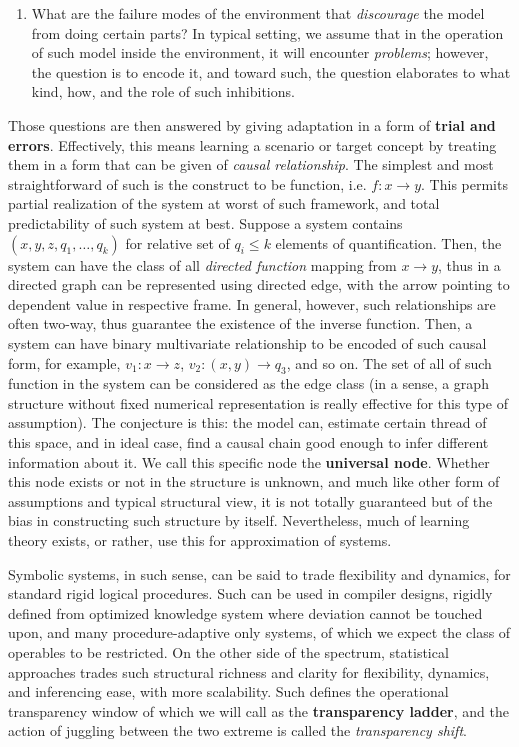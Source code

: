 \begin{enumerate}[itemsep=1pt,topsep=1pt]
    \item What are the failure modes of the environment that \textit{discourage} the model from doing certain parts? In typical setting, we assume that in the operation of such model inside the environment, it will encounter \textit{problems}; however, the question is to encode it, and toward such, the question elaborates to what kind, how, and the role of such inhibitions. 
\end{enumerate}

Those questions are then answered by giving adaptation in a form of \textbf{trial and errors}. Effectively, this means learning a scenario or target concept by treating them in a form that can be given of \textit{causal relationship}. The simplest and most straightforward of such is the construct to be function, i.e. $f:x\to y$. This permits partial realization of the system at worst of such framework, and total predictability of such system at best. Suppose a system contains $(x,y,z,q_{1},\dots,q_{k})$ for relative set of $q_{i}\leq k$ elements of quantification. Then, the system can have the class of all \textit{directed function} mapping from $x\to y$, thus in a directed graph can be represented using directed edge, with the arrow pointing to dependent value in respective frame. In general, however, such relationships are often two-way, thus guarantee the existence of the inverse function. Then, a system can have binary multivariate relationship to be encoded of such causal form, for example, $v_{1}: x\to z$, $v_{2}: (x,y)\to q_{3}$, and so on. The set of all of such function in the system can be considered as the edge class (in a sense, a graph structure without fixed numerical representation is really effective for this type of assumption). The conjecture is this: the model can, estimate certain thread of this space, and in ideal case, find a causal chain good enough to infer different information about it. We call this specific node the \textbf{universal node}. Whether this node exists or not in the structure is unknown, and much like other form of assumptions and typical structural view, it is not totally guaranteed but of the bias in constructing such structure by itself. Nevertheless, much of learning theory exists, or rather, use this for approximation of systems. 

Symbolic systems, in such sense, can be said to trade flexibility and dynamics, for standard rigid logical procedures. Such can be used in compiler designs, rigidly defined from optimized knowledge system where deviation cannot be touched upon, and many procedure-adaptive only systems, of which we expect the class of operables to be restricted. On the other side of the spectrum, statistical approaches trades such structural richness and clarity for flexibility, dynamics, and inferencing ease, with more scalability. Such defines the operational transparency window of which we will call as the \textbf{transparency ladder}, and the action of juggling between the two extreme is called the \textit{transparency shift}. 

